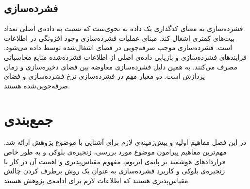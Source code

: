 \subsection{فشرده‌سازی}
فشرده‌سازی به معنای کدگذاری یک داده به نحوی‌ست که نسبت به داده‌ی اصلی تعداد بیت‌های کمتری اشغال کند. مبنای عملیات فشرده‌سازی وجود افزونگی
 در اطلاعات است. فشرده‌سازی موجب صرفه‌جویی در فضای اشغال‌شده توسط داده می‌شود. فرایند‌های فشرده‌سازی و بازیابی داده‌ی اصلی از اطلاعات فشرده‌شده منابع محاسباتی مصرف می‌کنند. به همین دلیل فشرده‌سازی معاوضه بین فضای دخیره‌سازی و زمان پردازش است. دو معیار مهم در فشرده‌سازی نرخ فشرده‌سازی
  و فضای صرفه‌جویی‌شده
  هستند. 

\section{جمع‌بندی}
در این فصل مفاهیم اولیه و پیش‌زمینه‌ی لازم برای آشنایی با موضوع پژوهش ارائه شد. مهم‌ترین مفاهیم پیرامون موضوع مورد بررسی، زنجیره‌ی بلوکی و به طور خاص قراردادهای هوشمند بر پایه‌ی اتریوم، مفهوم مقیاس‌پذیری و اهمیت آن در کار با زنجیره‌ی بلوکی و کاربرد فشرده‌سازی به عنوان یک روش برطرف کردن چالش مقیاس‌پذیری هستند که اطلاعات لازم برای ادامه‌ی پژوهش هستند.
